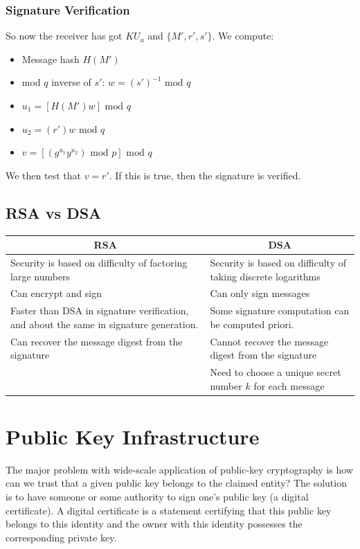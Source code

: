 \documentclass{article}
\newcommand{\Mod}[1]{\text{ mod }#1}
\begin{document}
\subsubsection{Signature Verification}
So now the receiver has got $KU_{a}$ and $\{M', r', s'\}$. We compute:
\begin{itemize}
  \item Message hash $H(M')$
  \item mod $q$ inverse of $s'$: $w = (s')^{-1} \Mod q$
  \item $u_{1} = [H(M')w] \Mod q$
  \item $u_{2} = (r')w \Mod q$
  \item $v = [(g^{u_{1}}y^{u_{2}}) \Mod p] \Mod q$
\end{itemize}
We then test that $v = r'$. If this is true, then the signature is verified.

\subsection{RSA vs DSA}
\begin{tabular}{|p{6cm}|p{6cm}|}
  \hline
  \multicolumn{1}{|c|}{\textbf{RSA}} & \multicolumn{1}{|c|}{\textbf{\textbf{DSA}}} \\ \hline
  Security is based on difficulty of factoring large numbers & Security is based on difficulty of taking discrete logarithms \\ \hline
  Can encrypt and sign & Can only sign messages \\ \hline
  Faster than DSA in signature verification, and about the same in signature generation. & Some signature computation can be computed priori. \\ \hline
  Can recover the message digest from the signature & Cannot recover the message digest from the signature \\ \hline
  & Need to choose a unique secret number $k$ for each message \\
  \hline
\end{tabular}

\section{Public Key Infrastructure}
The major problem with wide-scale application of public-key cryptography is how can we trust that a given public key belongs to the claimed entity? The solution is to have someone or some authority to sign one's public key (a digital certificate). A digital certificate is a statement certifying that this public key belongs to this identity and the owner with this identity possesses the corresponding private key.
\end{document}
